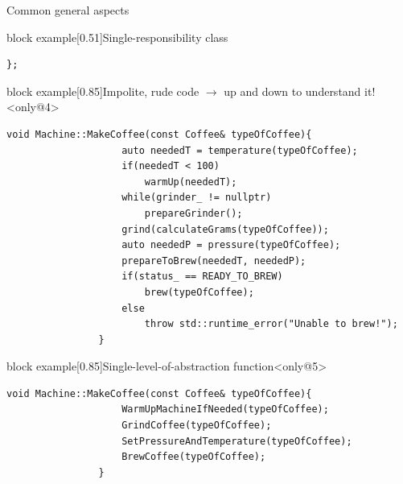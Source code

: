 \begin{frame}[fragile]{Common general aspects}
\begin{overlayarea}{\textwidth}{\textheight}
\begin{varblock}{block example}[0.51\textwidth]{Single-responsibility class}
\begin{lstlisting}[style=MyCpp]
                };
            \end{lstlisting}
        \end{varblock}
        \begin{varblock}{block example}[0.85\textwidth]{Impolite, rude code $\to$ up and down to understand it!}<only@4>
            \begin{lstlisting}[style=MyCpp]
                void Machine::MakeCoffee(const Coffee& typeOfCoffee){
                    auto neededT = temperature(typeOfCoffee);
                    if(neededT < 100)
                        warmUp(neededT);
                    while(grinder_ != nullptr)
                        prepareGrinder();
                    grind(calculateGrams(typeOfCoffee));
                    auto neededP = pressure(typeOfCoffee);
                    prepareToBrew(neededT, neededP);
                    if(status_ == READY_TO_BREW)
                        brew(typeOfCoffee);
                    else
                        throw std::runtime_error("Unable to brew!");
                }
            \end{lstlisting}
        \end{varblock}
        \begin{varblock}{block example}[0.85\textwidth]{Single-level-of-abstraction function}<only@5>
            \begin{lstlisting}[style=MyCpp]
                void Machine::MakeCoffee(const Coffee& typeOfCoffee){
                    WarmUpMachineIfNeeded(typeOfCoffee);
                    GrindCoffee(typeOfCoffee);
                    SetPressureAndTemperature(typeOfCoffee);
                    BrewCoffee(typeOfCoffee);
                }
            \end{lstlisting}
        \end{varblock}
    \end{overlayarea}
\end{frame}
